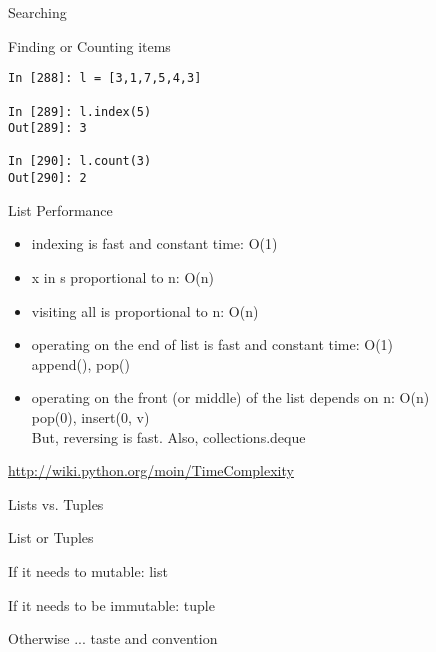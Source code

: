 \documentclass{beamer}
\begin{document}
\begin{frame}[fragile]{Searching}

{\Large Finding or Counting items}

\begin{verbatim}
In [288]: l = [3,1,7,5,4,3]

In [289]: l.index(5)
Out[289]: 3

In [290]: l.count(3)
Out[290]: 2
\end{verbatim}

\end{frame} 


\begin{frame}[fragile]{List Performance }

\begin{itemize}
  \item indexing is fast and constant time: O(1)
  \item x in s proportional to n: O(n)
  \item visiting all is proportional to n: O(n)
  \item operating on the end of list is fast and constant time: O(1) \\
     append(), pop()
  \item operating on the front (or middle) of the list depends on n: O(n)\\
     pop(0), insert(0, v) \\
     But, reversing is fast. Also, collections.deque
\end{itemize}

\url{ http://wiki.python.org/moin/TimeComplexity}

\end{frame} 


\begin{frame}[fragile]{Lists vs. Tuples}

\vfill
{\Large List or Tuples}

\vfill
{\Large
If it needs to mutable: list

\vfill
If it needs to be immutable: tuple\\
}
\hspace{0.2in}{\large (dict key, safety when passing to a function) }

\vfill
{\Large Otherwise ... taste and convention}

\end{frame} 
\end{document}
